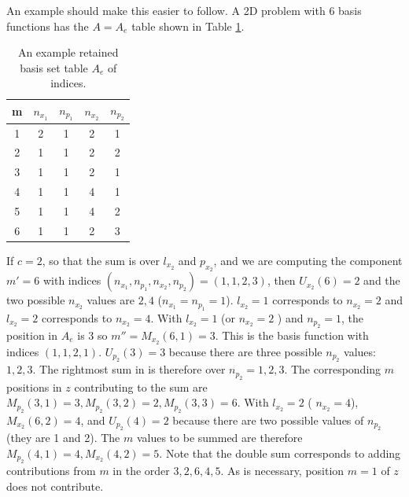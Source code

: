An example should make this easier to follow.    A    2D problem with $6$ basis functions  has the  $A = A_e$ table shown in 
 Table \ref{Tab.A}.
\begin{table}
\centering
\begin{small}
\caption{\label{Tab.A} An example retained basis set table $A_e$ of indices.}
\begin{tabular}{|c | c   c  c  c |  }
\hline
m & $n_{x_1}$ & $n_{p_1}$ & $n_{x_2}$ & $n_{p_2}$ \\	
\hline
 1 & 2 & 1 & 2 & 1 \\       
 2 & 1 & 1 & 2 & 2 \\
 3 & 1 & 1 & 2 & 1 \\
 4 & 1 & 1 & 4 & 1  \\
 5 & 1 & 1 & 4 & 2 \\
 6 & 1 & 1 & 2 & 3  \\          
  \hline                
\end{tabular} 
\end{small}
\end{table} 
%
If  $c=2$, so that the sum is over $l_{x_2}$ and $p_{x_2}$,   and we are computing   the component     $m'=6$ with indices  $(n_{x_1},n_{p_1},n_{x_2},n_{p_2})=(1,1,2,3)$, 
then $U_{x_2}(6) = 2$  and the two   possible $n_{x_2}$ values are  $2,4$ ($n_{x_1}=n_{p_1}=1$).    
%
 $l_{x_2}=1$ corresponds  to $n_{x_2}=2$ and   $l_{x_2}=2$ corresponds  to $n_{x_2}=4$.  
With  $l_{x_2}=1$ (or $n_{x_2}=2$ ) and $n_{p_2}=1$,  the position in $A_e$    is 3 so 
 $m''=M_{x_2}(6,1)=3$. This is the basis function with  indices $(1,1,2,1)$.    
%
  $U_{p_2}(3)=3$  because there are three    possible $n_{p_2}$ values:   $1,2,3$.
The rightmost  sum in   is  therefore over 
 $n_{p_2}=1,2,3$. 
The corresponding  $m$ positions in $z$ contributing to the sum are 
 $M_{p_2}(3,1)=3,M_{p_2}(3,2)=2,M_{p_2}(3,3)=6$.    
%
%
With $l_{x_2}=2$ ( $n_{x_2}=4$),    $M_{x_2}(6,2)=4$,   
  and $U_{p_2}(4)=2$  because there are two 
possible values of  $n_{p_2}$ (they are 1 and 2).   The $m$ values to be summed are therefore  $M_{p_2}(4,1)=4,M_{x_2}(4,2)=5$.  
Note that the double sum corresponds to adding contributions from $m$ in the order $3,2,6,4,5$.  
As is necessary, position $m=1$ of $z$ does  not contribute.

%















